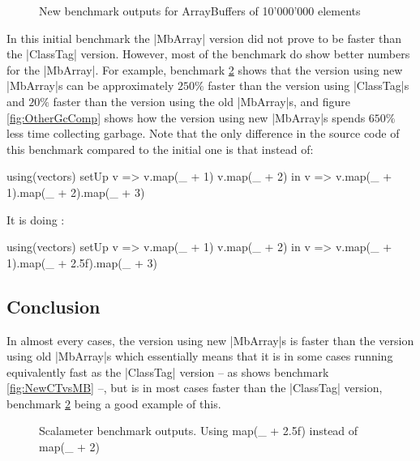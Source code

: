\begin{figure}
\caption{New benchmark outputs for ArrayBuffers of 10'000'000 elements}
\label{fig:NewGcComp}
\end{figure}

In this initial benchmark the |MbArray| version did not prove to be faster than the |ClassTag| version. However, most of the benchmark do show better numbers for the |MbArray|. For example, benchmark \ref{fig:OtherCTvsMB} shows that the version using new |MbArray|s can be approximately $250\%$ faster than the version using |ClassTag|s and $20\%$ faster than the version using the old |MbArray|s, and figure \ref{fig:OtherGcComp} shows how the version using new |MbArray|s spends $650\%$ less time collecting garbage. Note that the only difference in the source code of this benchmark compared to the initial one is that instead of:

\begin{lstlisting-nobreak}
  using(vectors) setUp {
    v => 
      v.map(_ + 1)
      v.map(_ + 2)
  } in {
    v => v.map(_ + 1).map(_ + 2).map(_ + 3)
  }
\end{lstlisting-nobreak}

It is doing : 

\begin{lstlisting-nobreak}
  using(vectors) setUp {
    v => 
      v.map(_ + 1)
      v.map(_ + 2)
  } in {
    v => v.map(_ + 1).map(_ + 2.5f).map(_ + 3)
  }
\end{lstlisting-nobreak}

\subsection{Conclusion}

In almost every cases, the version using new |MbArray|s is faster than the version using old |MbArray|s which essentially means that it is in some cases running equivalently fast as the |ClassTag| version -- as shows benchmark \ref{fig:NewCTvsMB} --, but is in most cases faster than the |ClassTag| version, benchmark \ref{fig:OtherCTvsMB} being a good example of this.  

\begin{figure}
\caption{Scalameter benchmark outputs. Using map(\_ + 2.5f) instead of map(\_ + 2)}
\label{fig:OtherCTvsMB}
\end{figure}

